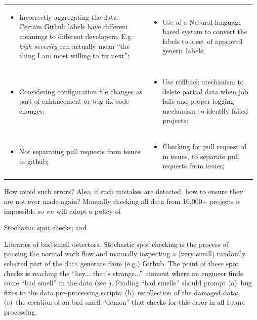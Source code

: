 \begin{table}[!t]
{\begin{tabular}{|p{.45\linewidth}p{.50\linewidth}|}
\rowcolor{white!10}
\small \begin{itemize} 
\item
Incorrectly aggregating the data. Certain Github labels have different meanings to different developers. E.g. {\em high severity} can actually mean ``the thing I am most willing to fix next'';
\end{itemize} & \begin{itemize} 
\item
Use of a Natural language based system to convert the labels to a set of approved generic labels;
\end{itemize} \\

\rowcolor{blue!10}
\small \begin{itemize} 
\item
Considering configuration file changes as part of enhancement or bug fix code changes;
\end{itemize} & \begin{itemize} 
\item
Use rollback mechanism to delete partial data when job fails and proper logging mechanism to identify failed projects;
\end{itemize} \\

\rowcolor{white!10}
\small \begin{itemize} 
\item
Not separating pull requests from issues in github;
\end{itemize} & \begin{itemize} 
\item
Checking for pull request id in issues, to separate pull requests from issues;
\end{itemize} \\\hline

\end{tabular}}
\end{table}
How avoid such errors? Also,  if such mistakes are detected, how to
ensure they are not ever made again?
Manually checking all data from 10,000+ projects  is impossible
so we will  adopt a policy of 
\bi
\item
Stochastic spot checks; and 
\item
Libraries of bad smell detectors.
\ei
Stochastic spot checking is the process of pausing the normal
work flow and manually inspecting a (very small) randomly selected part of the data  generate from (e.g.) Github. The point of these spot checks is  reaching the  ``hey... that's strange...'' moment where an  engineer finds some ``bad smell'' in the data (see ).  Finding ``bad smells'' should prompt
(a)~bug
fixes to the data pre-processing scripts;  (b)~recollection of the damaged data;
(c)~the creation of an  bad smell ``demon'' that checks for this  error  in all
future processing.

